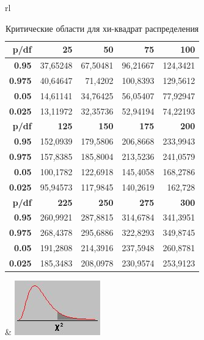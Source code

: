 \documentclass[_fin_decisions_lectures.tex]{subfiles}
\begin{document}
\begin{frame}[shrink=15]
\begin{table}[htbp]
  \centering
  \caption{Критические области для хи-квадрат распределения}
\begin{tabular}{rl}
    \begin{tabular}{rrrrr}
    \toprule
    \textbf{p/df} & \textbf{25} & \textbf{50} & \textbf{75} & \textbf{100} \\
    \midrule
    \textbf{0.95} & 37,65248 & 67,50481 & 96,21667 & 124,3421 \\
    \textbf{0.975} & 40,64647 & 71,4202 & 100,8393 & 129,5612 \\
    \textbf{0.05} & 14,61141 & 34,76425 & 56,05407 & 77,92947 \\
    \textbf{0.025} & 13,11972 & 32,35736 & 52,94194 & 74,22193 \\
    \bottomrule
    \textbf{p/df} & \textbf{125} & \textbf{150} & \textbf{175} & \textbf{200} \\
    \bottomrule
    \textbf{0.95} & 152,0939 & 179,5806 & 206,8668 & 233,9943 \\
    \textbf{0.975} & 157,8385 & 185,8004 & 213,5236 & 241,0579 \\
    \textbf{0.05} & 100,1782 & 122,6918 & 145,4058 & 168,2786 \\
    \textbf{0.025} & 95,94573 & 117,9845 & 140,2619 & 162,728 \\
    \bottomrule
    \textbf{p/df} & \textbf{225} & \textbf{250} & \textbf{275} & \textbf{300} \\
    \bottomrule
    \textbf{0.95} & 260,9921 & 287,8815 & 314,6784 & 341,3951 \\
    \textbf{0.975} & 268,4378 & 295,6886 & 322,8293 & 349,8745 \\
    \textbf{0.05} & 191,2808 & 214,3916 & 237,5948 & 260,8781 \\
    \textbf{0.025} & 185,3483 & 208,0978 & 230,9574 & 253,9123 \\
    \bottomrule
    \end{tabular}%
&
\includegraphics[scale=0.6]{img/chi2area.png}\\
\end{tabular}
  \label{tab:addlabel}%
\end{table}
\end{frame}
\end{document}
